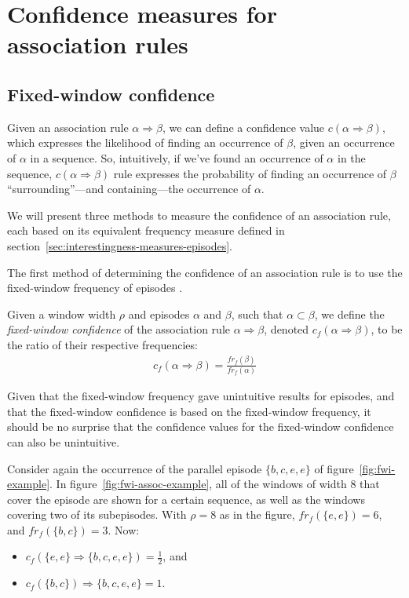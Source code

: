 \section{Confidence measures for association rules}
\label{sec:interestingness-measures-association-rules}

\subsection{Fixed-window confidence}

Given an association rule $ \alpha \Rightarrow \beta $, we can define a confidence value $ c(\alpha \Rightarrow \beta) $, which expresses the likelihood of finding an occurrence of $ \beta $, given an occurrence of $ \alpha $ in a sequence. So, intuitively, if we've found an occurrence of $ \alpha $ in the sequence, $ c(\alpha \Rightarrow \beta) $ rule expresses the probability of finding an occurrence of $ \beta $ ``surrounding''---and containing---the occurrence of $ \alpha $.

We will present three methods to measure the confidence of an association rule, each based on its equivalent frequency measure defined in section~\ref{sec:interestingness-measures-episodes}.

The first method of determining the confidence of an association rule is to use the fixed-window frequency of episodes \citep{mannila1997discovery}.

\begin{definition}
Given a window width $ \rho $ and episodes $ \alpha $ and $ \beta $, such that $ \alpha \subset \beta $, we define the \emph{fixed-window confidence} of the association rule $ \alpha \Rightarrow \beta $, denoted $ c_f(\alpha \Rightarrow \beta) $, to be the ratio of their respective frequencies:
\begin{align*}
c_f(\alpha \Rightarrow \beta) = \frac{ fr_f(\beta) }{ fr_f(\alpha) }
\end{align*}
\end{definition}

Given that the fixed-window frequency gave unintuitive results for episodes, and that the fixed-window confidence is based on the fixed-window frequency, it should be no surprise that the confidence values for the fixed-window confidence can also be unintuitive.

Consider again the occurrence of the parallel episode $ \{ b, c, e, e \} $ of figure~\ref{fig:fwi-example}. In figure~\ref{fig:fwi-assoc-example}, all of the windows of width $ 8 $ that cover the episode are shown for a certain sequence, as well as the windows covering two of its subepisodes. With $ \rho = 8 $ as in the figure, $ fr_f(\{ e, e \}) = 6 $, and $ fr_f(\{ b, c \}) = 3 $. Now:
\begin{itemize}
\item $ c_f(\{ e, e \} \Rightarrow \{ b, c, e, e \}) = \frac12 $, and
\item $ c_f(\{ b, c \}) \Rightarrow \{ b, c, e, e \} = 1 $.
\end{itemize}

